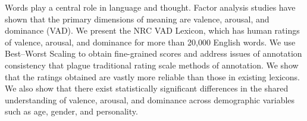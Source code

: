 Words play a central role in language and thought. Factor analysis studies have shown that the primary dimensions of meaning are valence, arousal, and dominance (VAD). We present the NRC VAD Lexicon, which has human ratings of valence, arousal, and dominance for more than 20,000 English words. We use Best--Worst Scaling to obtain fine-grained scores and address issues of annotation consistency that plague traditional rating scale methods of annotation. We show that the ratings obtained are vastly more reliable than those in existing lexicons. We also show that there exist statistically significant differences in the shared understanding of valence, arousal, and dominance across demographic variables such as age, gender, and personality.
